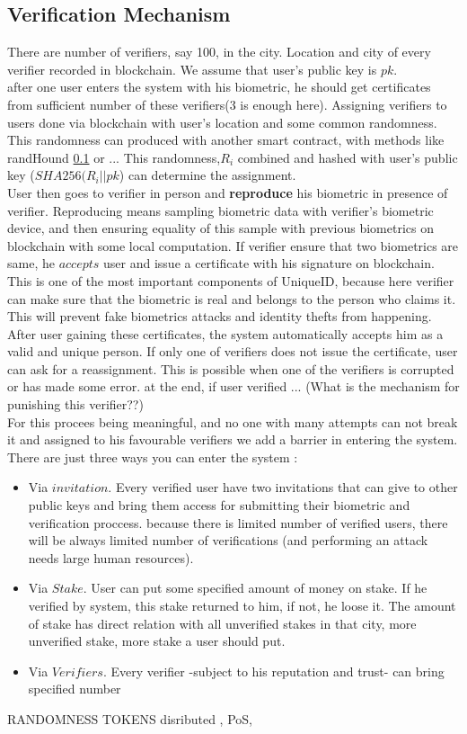 \documentclass{article}
\begin{document}
\subsection{Verification Mechanism}
There are number of verifiers, say 100, in the city. Location and city of every verifier recorded in blockchain. We assume that user's public key is $pk$.
\\

 after one user enters the system with his biometric, he should get certificates from sufficient number of these verifiers(3 is enough here). Assigning verifiers to users done via blockchain with user's location and some common randomness. This randomness can produced with another smart contract, with methods like randHound \ref{} or ...   This randomness,$ R_i$ combined and hashed with user's public key ($SHA256(R_i || pk$) can determine the assignment. \\ 
User then goes to verifier in person and \textbf{reproduce}  his biometric in presence of verifier. Reproducing means sampling biometric data with verifier's biometric device, and then ensuring equality of this sample with previous biometrics on blockchain with some local computation. If verifier ensure that two biometrics are same, he $accepts$ user and issue a certificate with his signature on blockchain. This is one of the most important components of UniqueID, because here verifier can make sure that the biometric is real and belongs to the person who claims it. This will prevent fake biometrics attacks and identity thefts from happening.
\\
After user gaining these certificates, the system automatically accepts him  as a valid and unique person. If only one of verifiers does not issue the certificate, user can ask for a reassignment. This is possible when one of the verifiers is corrupted or has made some error. at the end, if user verified ... (What is the mechanism for punishing this verifier??)
\\
For this procees being meaningful, and no one with many attempts can not break it and assigned to his favourable verifiers we add a barrier in entering the system. There are just three ways you can enter the system :
\begin{itemize}
\item Via $invitation$. Every verified user have two invitations that can give to other public keys and bring them access for submitting their biometric and verification proccess. because there is limited number of verified users, there will be always limited number of verifications (and performing an attack needs large human resources).

\item Via $Stake$. User can put some specified amount of money on stake. If he verified by system, this stake returned to him, if not, he loose it. The amount of stake has direct relation with all unverified stakes in that city, more unverified stake, more stake a user should put.

\item Via $Verifiers$. Every verifier -subject to his reputation and trust- can bring specified number  
\end{itemize}
RANDOMNESS TOKENS disributed , PoS, 
\end{document}
